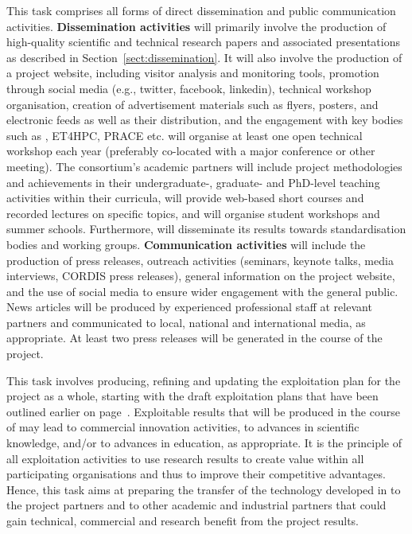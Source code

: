 \begin{Workpackage}{\thewpno}
\begin{Task}
This task comprises all forms of direct dissemination and public communication activities.
%
\textbf{Dissemination activities} will primarily involve the production of high-quality scientific and technical research papers and associated presentations as described in Section~\ref{sect:dissemination}.
It will also involve the production of a project website, including visitor analysis and monitoring tools, promotion through social media (e.g., twitter, facebook, linkedin), technical workshop organisation, creation of advertisement materials such as flyers, posters, and electronic feeds as well as their distribution, and the engagement with key bodies such as \hipeac, ET4HPC, PRACE etc.
\TheProject{} will organise at least one open technical workshop each year
(preferably co-located with a major conference or other meeting).
The consortium's academic partners will include project methodologies and achievements in their undergraduate-, graduate- and PhD-level teaching activities within their curricula, will provide web-based short courses and recorded lectures on specific \TheProject topics, and will organise student workshops and summer schools.
Furthermore, \TheProject will disseminate its results towards standardisation bodies and working groups.
%
\textbf{Communication activities} will include the production of press releases, outreach activities (seminars, keynote talks, media interviews, CORDIS press releases), general information on the project website, and the use of social media to ensure wider engagement with the general public.
News articles will be produced by experienced professional staff at relevant partners and communicated to local, national and international media, as appropriate.
At least two press releases will be generated in the course of the project.
\end{Task}

\begin{Task}


\TaskHeader{}


This task involves producing, refining and updating the exploitation plan for the project as a whole, starting with the draft exploitation plans that have been outlined earlier on page~\pageref{sect:exploitation-plan}.
Exploitable results that will be produced in the course of \TheProject may lead to commercial innovation activities, to advances in scientific knowledge, and/or to advances in education, as appropriate.
It is the principle of all exploitation activities to use research results to create value within all participating organisations and thus to improve their competitive advantages.
Hence, this task aims at preparing the transfer of the technology developed in \TheProject{} to the project partners and to other academic and industrial partners that could gain technical, commercial and research benefit from the project results.


\end{Task}
\end{Workpackage}
